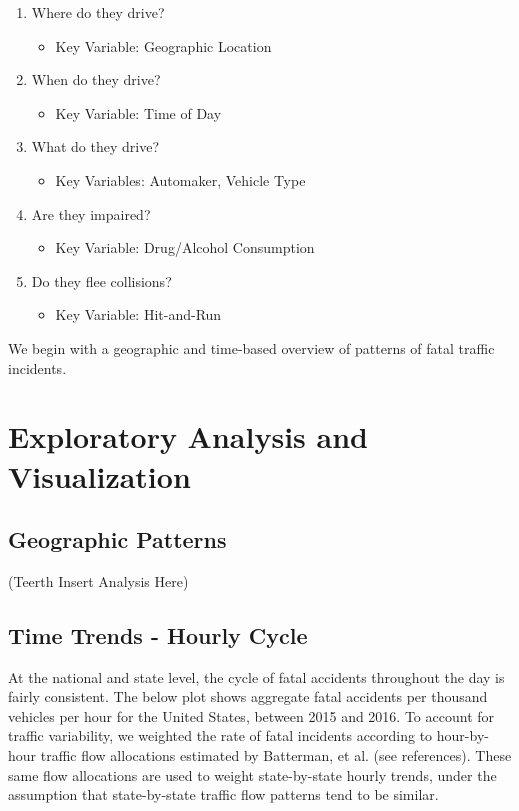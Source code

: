 \documentclass[11pt, oneside,titlepage]{article}   	%
\begin{document}
\begin{enumerate}
\item Where do they drive?
\begin{itemize}
\item Key Variable: Geographic Location
\end{itemize}
\item When do they drive?
\begin{itemize}
\item Key Variable: Time of Day
\end{itemize}
\item What do they drive?
\begin{itemize}
\item Key Variables: Automaker, Vehicle Type
\end{itemize}
\item Are they impaired?
\begin{itemize}
\item Key Variable: Drug/Alcohol Consumption
\end{itemize}
\item Do they flee collisions?
\begin{itemize}
\item Key Variable: Hit-and-Run
\end{itemize}
\end{enumerate}

We begin with a geographic and time-based overview of patterns of fatal traffic incidents.

\section*{Exploratory Analysis and Visualization}

\subsection*{Geographic Patterns}

(Teerth Insert Analysis Here)


\subsection*{Time Trends - Hourly Cycle}
At the national and state level, the cycle of fatal accidents throughout the day is fairly consistent. The below plot shows aggregate fatal accidents per thousand vehicles per hour for the United States, between 2015 and 2016. To account for traffic variability, we weighted the rate of fatal incidents according to hour-by-hour traffic flow allocations estimated by Batterman, et al. (see references). These same flow allocations are used to weight state-by-state hourly trends, under the assumption that state-by-state traffic flow patterns tend to be similar. \\
\end{document}

